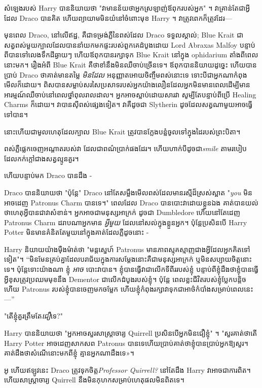 {{សំឡេងរបស់ Harry បាននិយាយថា "វាមានន័យថាអ្នកស្រឡាញ់ឪពុករបស់អ្នក" ។ វាគ្រាន់តែជាអ្វីដែល Draco បានគិត ហើយព្យាយាមមិនយំនៅចំពោះមុខ Harry ។ វា​ត្រូវ​ពេក​ក៏​ត្រូវ​ដែរ—

មុនពេល Draco, នៅលើឥដ្ឋ, គឺជាទម្រង់ភ្លឺនៃពស់ដែល Draco ទទួលស្គាល់; Blue Krait ជាសត្វពស់មួយក្បាលដែលបាននាំយកមកផ្ទះរបស់ពួកគេដំបូងដោយ Lord Abraxas Malfoy បន្ទាប់ពីបានទៅលេងទឹកដីឆ្ងាយៗ ហើយឪពុកបានរក្សាទុក Blue Krait នៅក្នុង ophidarium តាំងពីពេលនោះមក។ រឿងអំពី Blue Krait គឺថាខាំនឹងមិនឈឺចាប់ច្រើនទេ។ ឪពុកបាននិយាយដូច្នេះ ហើយបានប្រាប់ Draco ថាគាត់មានតម្លៃ \emph{មិនដែល} អនុញ្ញាតអោយចិញ្ចឹមពស់នោះទេ ទោះបីជាអ្នកណាកំពុងមើលក៏ដោយ។ ពិស​បាន​សម្លាប់​សរសៃប្រសាទ​របស់​អ្នក​យ៉ាង​លឿន​ដែល​អ្នក​មិន​មាន​ពេល​ដើម្បី​មាន​អារម្មណ៍​ឈឺចាប់​នៅពេល​ថ្នាំពុល​រាលដាល​។ អ្នកអាចស្លាប់ដោយសារវា សូម្បីតែបន្ទាប់ពីប្រើ Healing Charms ក៏ដោយ។ វាបានស៊ីពស់ផ្សេងទៀត។ វាគឺដូចជា Slytherin ដូចដែលសត្វណាមួយអាចធ្វើទៅបាន។

នោះហើយជាមូលហេតុដែលក្បាល Blue Krait ត្រូវបានក្លែងបន្លំចូលទៅក្នុងដៃរបស់ព្រះបិតា។

ពស់ភ្លឺផ្លេកចេញអណ្តាតរបស់វា ដែលជាពណ៌ប្រាក់ផងដែរ។ ហើយហាក់បីដូចជា\emph{smile} តាមរបៀបដែលកក់ក្តៅជាងសត្វល្មូនគួរ។

ហើយបន្ទាប់មក Draco បានដឹង -

Draco បាននិយាយថា "ប៉ុន្តែ" Draco នៅតែសម្លឹងមើលពស់ដែលមានរស្មីដ៏ស្រស់ស្អាត "\emph{you} មិនអាចដេញ Patronus Charm បានទេ។" ពេល​ដែល Draco បាន​បោះ​វា​ដោយ​ខ្លួន​ឯង គាត់​បាន​យល់​ថា​ហេតុអ្វី​បាន​ជា​វា​សំខាន់។ អ្នកអាចជាមនុស្សអាក្រក់ ដូចជា Dumbledore ហើយនៅតែដេញ Patronus Charm ដរាបណាអ្នកមាន \emph{អ្វីមួយ} ដែលនៅសល់ក្នុងខ្លួនអ្នក។ ប៉ុន្តែប្រសិនបើ Harry Potter មិនមានគំនិតតែមួយនៅក្នុងគាត់ដែលភ្លឺដូចនោះ -

Harry និយាយយ៉ាងម៉ឺងម៉ាត់ថា "មន្តស្នេហ៍ Patronus មានភាពស្មុគស្មាញជាងអ្វីដែលអ្នកគិតទៅទៀត"។ “មិនមែន​គ្រប់​គ្នា​ដែល​បរាជ័យ​ក្នុង​ការ​សម្ដែង​នោះ​គឺ​ជា​មនុស្ស​អាក្រក់ ឬ​មិន​សប្បាយ​ចិត្ត​នោះ​ទេ។ ប៉ុន្តែទោះយ៉ាងណា ខ្ញុំ \emph{អាច} បោះវាបាន។ ខ្ញុំ​បាន​ធ្វើ​វា​ជា​លើក​ទី​ពីរ​របស់​ខ្ញុំ បន្ទាប់​ពី​ខ្ញុំ​ដឹង​ថា​ខ្ញុំ​បាន​ធ្វើ​អ្វី​ខុស​ត្រូវ​ប្រឈម​មុខ​នឹង Dementor ជា​លើក​ដំបូង​របស់​ខ្ញុំ។ ប៉ុន្តែ ពេលខ្លះជីវិតរបស់ខ្ញុំប្លែកបន្តិច ហើយ Patronus របស់ខ្ញុំបានចេញមកចម្លែក ហើយខ្ញុំកំពុងរក្សាវាទុកជាអាថ៌កំបាំងសម្រាប់ពេលនេះ —”

"តើខ្ញុំគួរត្រឹមតែ\emph{ជឿ}ទេ?"

Harry បាននិយាយថា "អ្នកអាចសួរសាស្រ្តាចារ្យ Quirrell ប្រសិនបើអ្នកមិនជឿខ្ញុំ" ។ "សួរគាត់ថាតើ Harry Potter អាចដេញសាកសព Patronus បានទេហើយប្រាប់គាត់ថាខ្ញុំបានប្រាប់អ្នកឱ្យសួរ។ គាត់​ដឹង​ថា​សំណើ​នោះ​មក​ពី​ខ្ញុំ គ្មាន​អ្នក​ណា​ដឹង​ទេ»។

អូ ហើយឥឡូវនេះ Draco ត្រូវទុកចិត្ត\emph{Professor Quirrell?} នៅតែដឹង Harry វាអាចជាការពិត។ ហើយសាស្រ្តាចារ្យ Quirrell នឹងមិនកុហកសម្រាប់ហេតុផលមិនពិតទេ។

}}

